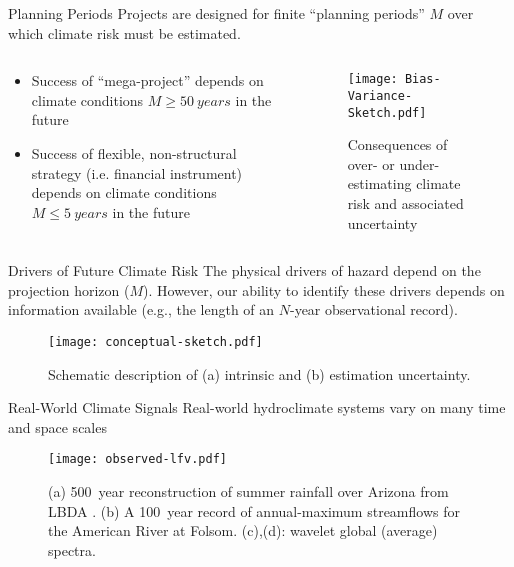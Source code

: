 \documentclass[
  10pt,     %
  handout   %
]{beamer}
\makeatletter
\newcommand*{\eg}{e.g.\@\xspace}
\newcommand*{\ie}{i.e.\@\xspace}
\makeatother
\begin{document}
\begin{frame}{Planning Periods}
  Projects are designed for finite ``planning periods'' $M$ over which climate risk must be estimated.
  \begin{columns}
    \begin{column}{0.6\textwidth}
      \begin{itemize}
        \item Success of ``mega-project'' depends on climate conditions $M \geq \SI{50}{years}$ in the future
        \item Success of flexible, non-structural strategy (\ie financial instrument) depends on climate conditions $M \leq \SI{5}{years}$ in the future
      \end{itemize}
    \end{column}
    \begin{column}{0.4\textwidth}
      \begin{figure}
        \texttt{[image: Bias-Variance-Sketch.pdf]}
        \caption{Consequences of over- or under-estimating climate risk and associated uncertainty}
      \end{figure}
    \end{column}
  \end{columns}
\end{frame}


\begin{frame}{Drivers of Future Climate Risk}
  The physical drivers of hazard depend on the projection horizon ($M$).
  However, our ability to identify these drivers depends on information available (\eg, the length of an $N$-year observational record).
  \begin{figure}
    \centering
    \texttt{[image: conceptual-sketch.pdf]}
    \caption{Schematic description of (a) intrinsic and (b) estimation uncertainty.}
  \end{figure}
\end{frame}

\begin{frame}{Real-World Climate Signals}
  Real-world hydroclimate systems vary on many time and space scales
  \begin{figure}
    \centering
    \texttt{[image: observed-lfv.pdf]}
    \caption{
      (a) \SI{500}{year} reconstruction of summer rainfall over Arizona from LBDA \citep{Cook:2010bz}.
      (b) A \SI{100}{year} record of annual-maximum streamflows for the American River at Folsom.
      (c),(d): wavelet global (average) spectra.
    }\label{fig:observed-lfv}
  \end{figure}
\end{frame}
\end{document}
